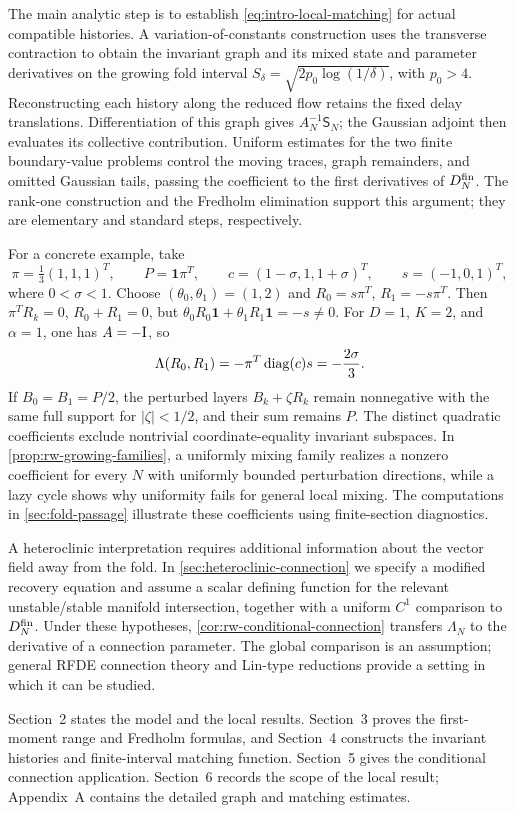 The main analytic step is to establish \eqref{eq:intro-local-matching} for
actual compatible histories.  A variation-of-constants construction uses the
transverse contraction to obtain the invariant graph and its mixed state
and parameter derivatives on the growing fold interval
\(S_\delta=\sqrt{2p_0\log(1/\delta)}\), with \(p_0>4\).
Reconstructing each history along the reduced flow retains the fixed delay
translations.  Differentiation of this graph gives
\(A_N^{-1}\mathsf S_N\); the Gaussian adjoint then evaluates its collective
contribution.  Uniform estimates for the two finite boundary-value problems
control the moving traces, graph remainders, and omitted Gaussian tails,
passing the coefficient to the first derivatives of \(D_N^{\rm fin}\).
The rank-one construction and the Fredholm elimination support this argument;
they are elementary and standard steps, respectively.

For a concrete example, take
\[
 \pi=\tfrac13(1,1,1)^T,\qquad P=\mathbf1\pi^T,\qquad
 c=(1-\sigma,1,1+\sigma)^T,\qquad s=(-1,0,1)^T,
\]
where \(0<\sigma<1\).  Choose \((\theta_0,\theta_1)=(1,2)\) and
\(R_0=s\pi^T\), \(R_1=-s\pi^T\).  Then
\(\pi^TR_k=0\), \(R_0+R_1=0\), but
\(\theta_0R_0\mathbf1+\theta_1R_1\mathbf1=-s\ne0\).
For \(D=1\), \(K=2\), and \(\alpha=1\), one has \(A=-\mathrm I\), so
\begin{equation}
 \Lambda(R_0,R_1)=-\pi^T\operatorname{diag}(c)s=-\frac{2\sigma}{3}.
                                                        \label{eq:intro-three-node-response}
\end{equation}
If \(B_0=B_1=P/2\), the perturbed layers \(B_k+\zeta R_k\) remain
nonnegative with the same full support for \(|\zeta|<1/2\), and their sum
remains \(P\).  The distinct quadratic coefficients exclude nontrivial
coordinate-equality invariant subspaces.  In
\cref{prop:rw-growing-families}, a uniformly mixing family realizes a
nonzero coefficient for every \(N\) with uniformly bounded perturbation
directions, while a lazy cycle shows why uniformity fails for general local
mixing.  The computations in \cref{sec:fold-passage} illustrate these
coefficients using finite-section diagnostics.

A heteroclinic interpretation requires additional information about the
vector field away from the fold.  In \cref{sec:heteroclinic-connection} we
specify a modified recovery equation and assume a scalar defining function
for the relevant unstable/stable manifold intersection, together with a
uniform \(C^1\) comparison to \(D_N^{\rm fin}\).
Under these hypotheses, \cref{cor:rw-conditional-connection} transfers
\(\Lambda_N\) to the derivative of a connection parameter.  The global
comparison is an assumption; general RFDE connection theory and Lin-type
reductions \citep{hale1986heteroclinic,malletparet1999fredholm,hupkes2009lin}
provide a setting in which it can be studied.

Section~2 states the model and the local results.  Section~3 proves the
first-moment range and Fredholm formulas, and Section~4 constructs the
invariant histories and finite-interval matching function.  Section~5 gives
the conditional connection application.  Section~6 records the scope of the
local result; Appendix~A contains the detailed graph and matching estimates.
